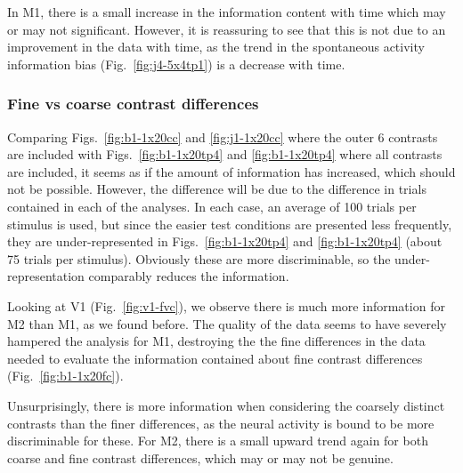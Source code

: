 In M1, there is a small increase in the information content with time which may or may not significant. However, it is reassuring to see that this is not due to an improvement in the data with time, as the trend in the spontaneous activity information bias (Fig.~\ref{fig:j4-5x4tp1}) is a decrease with time.

\FloatBarrier
\subsubsection{Fine vs coarse contrast differences}

Comparing Figs.~\ref{fig:b1-1x20cc} and \ref{fig:j1-1x20cc} where the outer 6 contrasts are included with Figs.~\ref{fig:b1-1x20tp4} and \ref{fig:b1-1x20tp4} where all contrasts are included, it seems as if the amount of information has increased, which should not be possible. However, the difference will be due to the difference in trials contained in each of the analyses. In each case, an average of 100 trials per stimulus is used, but since the easier test conditions are presented less frequently, they are under-represented in Figs.~\ref{fig:b1-1x20tp4} and \ref{fig:b1-1x20tp4} (about 75 trials per stimulus). Obviously these are more discriminable, so the under-representation comparably reduces the information.

Looking at V1 (Fig.~\ref{fig:v1-fvc}), we observe there is much more information for M2 than M1, as we found before. The quality of the data seems to have severely hampered the analysis for M1, destroying the the fine differences in the data needed to evaluate the information contained about fine contrast differences (Fig.~\ref{fig:b1-1x20fc}).

Unsurprisingly, there is more information when considering the coarsely distinct contrasts than the finer differences, as the neural activity is bound to be more discriminable for these. For M2, there is a small upward trend again for both coarse and fine contrast differences, which may or may not be genuine.


